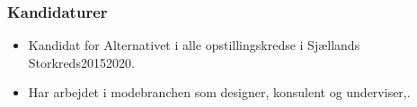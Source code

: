 \documentclass[11pt, a4paper]{awesome-cv}
\begin{document}
\begin{cvletter}
\subsubsection*{Kandidaturer}
\begin{itemize}
\item Kandidat for Alternativet i alle opstillingskredse i Sjællands Storkreds20152020.
\end{itemize}
\begin{itemize}
\item  Har arbejdet i modebranchen som designer, konsulent og underviser,.
\end{itemize}
\end{cvletter}
\end{document}
